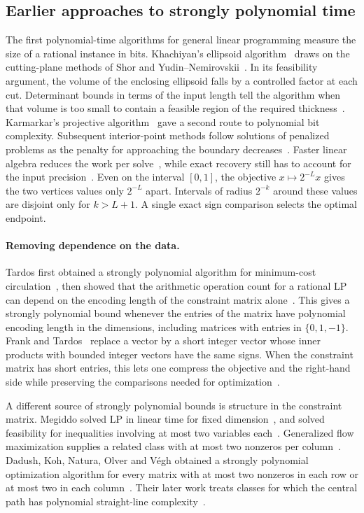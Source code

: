 \subsection{Earlier approaches to strongly polynomial time}
\label{sec:lp-context}

The first polynomial-time algorithms for general linear programming
measure the size of a rational instance in bits. Khachiyan's ellipsoid
algorithm~\cite{Khach,Khach2} draws on the cutting-plane methods of
Shor and Yudin--Nemirovskii~\cite{Shor,YN}. In its feasibility argument,
the volume of the enclosing ellipsoid falls by a controlled factor at
each cut. Determinant bounds in terms of the input length tell the
algorithm when that volume is too small to contain a feasible region
of the required thickness~\cite{GLS}. Karmarkar's projective
algorithm~\cite{Kar} gave a second route to polynomial bit complexity.
Subsequent interior-point methods follow solutions of penalized problems
as the penalty for approaching the boundary decreases~\cite{NN}.
Faster linear algebra reduces the work per solve~\cite{Ren,Vai,CLS,VDB},
while exact recovery still has to account for the input
precision~\cite{GPV}. Even on the interval $[0,1]$, the objective
$x\mapsto 2^{-L}x$ gives the two vertices values only $2^{-L}$ apart.
Intervals of radius $2^{-k}$ around these values are disjoint only for
$k>L+1$. A single exact sign comparison selects the optimal endpoint.

\paragraph{Removing dependence on the data.}
Tardos first obtained a strongly polynomial algorithm for minimum-cost
circulation~\cite{TarCirc}, then showed that the arithmetic operation
count for a rational LP can depend on the encoding length of the
constraint matrix alone~\cite{Tardos}. This gives a strongly polynomial
bound whenever the entries of the matrix have polynomial encoding length
in the dimensions, including matrices with entries in $\{0,1,-1\}$.
Frank and Tardos~\cite{FT} replace a vector by a short integer vector
whose inner products with bounded integer vectors have the same signs.
When the constraint matrix has short entries, this lets one compress
the objective and the right-hand side while preserving the comparisons
needed for optimization~\cite[\S6.6]{GLS}.

A different source of strongly polynomial bounds is structure in the
constraint matrix. Megiddo solved LP in linear time for fixed
dimension~\cite{MegLin}, and solved feasibility for inequalities
involving at most two variables each~\cite{Meg}. Generalized flow
maximization supplies a related class with at most two nonzeros per
column~\cite{Vegh,OV}. Dadush, Koh, Natura, Olver and V\'egh obtained a
strongly polynomial optimization algorithm for every matrix with at
most two nonzeros in each row or at most two in each
column~\cite{DKNOV}. Their later work treats classes for which the
central path has polynomial straight-line complexity~\cite{DKNOV26}.

